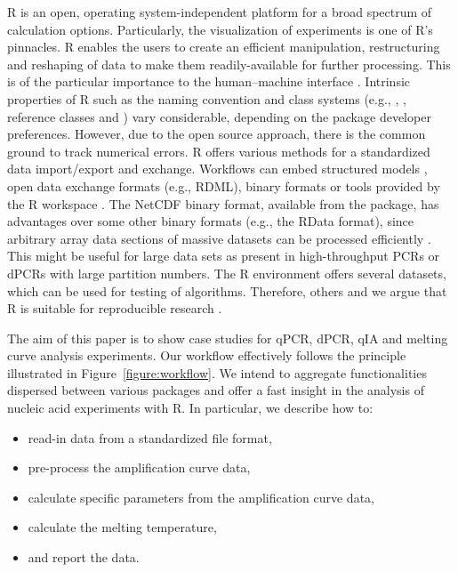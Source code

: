 R is an open, operating system-independent platform for a broad spectrum of 
calculation options. Particularly, the visualization of experiments is one of 
R's pinnacles. R enables the users to create an efficient manipulation, 
restructuring and reshaping of data to make them readily-available for further 
processing. This is of the particular importance to the human--machine interface 
\citep{Oh_2014}. Intrinsic properties of R such as the naming convention 
\citep{Baaaath_2012} and class systems (e.g., , , 
reference classes and ) vary considerable, depending on the package 
developer preferences. However, due to the open source approach, there is the 
common ground to track numerical errors. R offers various methods for a 
standardized data import/export and exchange. Workflows can embed structured 
models \citet{Guazzelli_2009}, open data exchange formats (e.g., RDML), binary 
formats \citep{michna_2013} or tools provided by the R workspace 
\citep{RDCT2010c}. The NetCDF binary format, available from the 
 package, has advantages over some other binary formats (e.g., 
the RData format), since arbitrary array data sections of massive datasets can 
be processed efficiently \citep{michna_2013}. This might be useful for large 
data sets as present in high-throughput PCRs or dPCRs with large partition 
numbers. The R environment offers several datasets, which can be used for 
testing of algorithms. Therefore, others and we argue that R is suitable for 
reproducible research \citep{Murrell_2012, gandrud_2013, hofmann_2013, 
Ooms_2013, kuhn_cran_2014, Leeper_2014, liu_2014}.

The aim of this paper is to show case studies for qPCR, dPCR, qIA and melting 
curve analysis experiments. Our workflow effectively follows the principle 
illustrated in Figure~\ref{figure:workflow}. We intend to aggregate 
functionalities dispersed between various packages and offer a fast insight in 
the analysis of nucleic acid experiments with R. In particular, we describe how 
to:

\begin{itemize}
 \item read-in data from a standardized file format,
 \item pre-process the amplification curve data,
 \item calculate specific parameters from the amplification curve data,
 \item calculate the melting temperature,
 \item and report the data.
\end{itemize}

